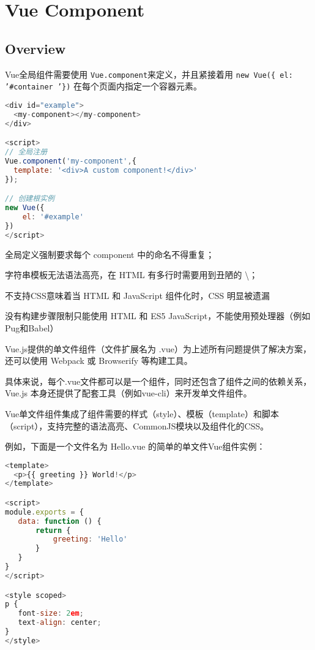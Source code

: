 \part{Vue Component}


\chapter{Overview}




Vue全局组件需要使用 \texttt{Vue.component}来定义，并且紧接着用 \texttt{new Vue(\{ el: '\#container '\})} 在每个页面内指定一个容器元素。



\begin{lstlisting}[language=JavaScript]
<div id="example">
  <my-component></my-component>
</div>

<script>
// 全局注册
Vue.component('my-component',{
  template: '<div>A custom component!</div>'
});

// 创建根实例
new Vue({
    el: '#example'
})
</script>
\end{lstlisting}

\begin{compactitem}
\item 全局定义强制要求每个 component 中的命名不得重复；
\item 字符串模板无法语法高亮，在 HTML 有多行时需要用到丑陋的 \textbackslash；
\item 不支持CSS意味着当 HTML 和 JavaScript 组件化时，CSS 明显被遗漏
\item 没有构建步骤限制只能使用 HTML 和 ES5 JavaScript，不能使用预处理器（例如Pug和Babel）
\end{compactitem}



Vue.js提供的单文件组件（文件扩展名为 .vue）为上述所有问题提供了解决方案，还可以使用 Webpack 或 Browserify 等构建工具。



具体来说，每个.vue文件都可以是一个组件，同时还包含了组件之间的依赖关系，Vue.js 本身还提供了配套工具（例如vue-cli）来开发单文件组件。

Vue单文件组件集成了组件需要的样式（style）、模板（template）和脚本（script），支持完整的语法高亮、CommonJS模块以及组件化的CSS。

例如，下面是一个文件名为 Hello.vue 的简单的单文件Vue组件实例：

\begin{lstlisting}[language=JavaScript]
<template>
  <p>{{ greeting }} World!</p>
</template>

<script>
module.exports = {
   data: function () {
       return {
           greeting: 'Hello'
       }
   }
}
</script>

<style scoped>
p {
   font-size: 2em;
   text-align: center;
}
</style>
\end{lstlisting}





